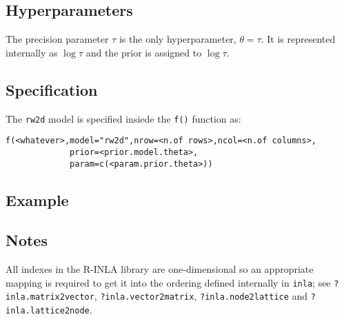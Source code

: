 \documentclass[a4paper,11pt]{article}
\begin{document}
\subsection*{Hyperparameters}

The precision parameter $\tau$ is the only hyperparameter, $\theta =
\tau$. It is represented internally as $\log\tau$ and the prior is
assigned to $\log\tau$.

\subsection*{Specification}

The {\tt rw2d} model is specified insiede the {\tt f()} function as:
\begin{verbatim}
f(<whatever>,model="rw2d",nrow=<n.of rows>,ncol=<n.of columns>,
             prior=<prior.model.theta>,
             param=c(<param.prior.theta>))
\end{verbatim}
\subsection*{Example}



\subsection*{Notes}
All indexes in the R-INLA library are one-dimensional so an
appropriate mapping is required to get it into the ordering defined
internally in \verb|inla|; see \verb|?inla.matrix2vector|,
\verb|?inla.vector2matrix|, \verb|?inla.node2lattice| and
\verb|?inla.lattice2node|.

{\small}
\end{document}

